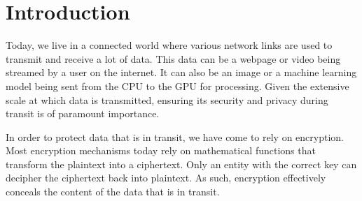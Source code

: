 
\chapter{Introduction}
\label{ch:Introduction}

Today, we live in a connected world where various network links are used to transmit and receive a lot of data. 
This data can be a webpage or video being streamed by a user on the internet. 
It can also be an image or a machine learning model being sent from the CPU to the GPU for processing. 
Given the extensive scale at which data is transmitted, ensuring its security and privacy during transit is of paramount importance.

In order to protect data that is in transit, we have come to rely on encryption. 
Most encryption mechanisms today rely on mathematical functions that transform the plaintext into a ciphertext. 
Only an entity with the correct key can decipher the ciphertext back into plaintext. 
As such, encryption effectively conceals the content of the data that is in transit.

